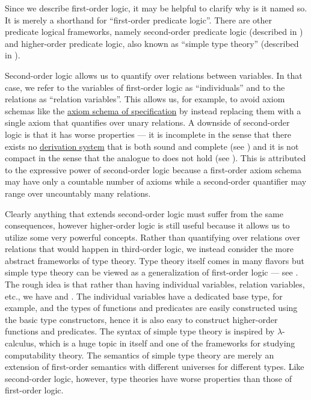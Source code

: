 \begin{remark}\label{rem:higher_order_logic}
  Since we describe first-order logic, it may be helpful to clarify why is it named so. It is merely a shorthand for \enquote{first-order predicate logic}. There are other predicate logical frameworks, namely second-order predicate logic (described in \cite[ch. VIII]{OpenLogicFull}) and higher-order predicate logic, also known as \enquote{simple type theory} (described in \cite[sec. 3]{Farmer2008}).

  Second-order logic allows us to quantify over relations between variables. In that case, we refer to the variables of first-order logic as \enquote{individuals} and to the relations as \enquote{relation variables}. This allows us, for example, to avoid axiom schemas like the \hyperref[def:zfc/specification]{axiom schema of specification} by instead replacing them with a single axiom that quantifies over unary relations. A downside of second-order logic is that it has worse properties --- it is incomplete in the sense that there exists no \hyperref[def:proof_derivation_system]{derivation system} that is both sound and complete (see \cite[thm. 39.6]{OpenLogicFull}) and it is not compact in the sense that the analogue to  does not hold (see \cite[thm. 39.7]{OpenLogicFull}). This is attributed to the expressive power of second-order logic because a first-order axiom schema may have only a countable number of axioms while a second-order quantifier may range over uncountably many relations.

  Clearly anything that extends second-order logic must suffer from the same consequences, however higher-order logic is still useful because it allows us to utilize some very powerful concepts. Rather than quantifying over relations over relations that would happen in third-order logic, we instead consider the more abstract frameworks of type theory. Type theory itself comes in many flavors but simple type theory can be viewed as a generalization of first-order logic --- see \cite[thm. 2]{Farmer2008}. The rough idea is that rather than having individual variables, relation variables, etc., we have  and . The individual variables have a dedicated base type, for example, and the types of functions and predicates are easily constructed using the basic type constructors, hence it is also easy to construct higher-order functions and predicates. The syntax of simple type theory is inspired by \( \lambda \)-calculus, which is a huge topic in itself and one of the frameworks for studying computability theory. The semantics of simple type theory are merely an extension of first-order semantics with different universes for different types. Like second-order logic, however, type theories have worse properties than those of first-order logic.


\end{remark}
